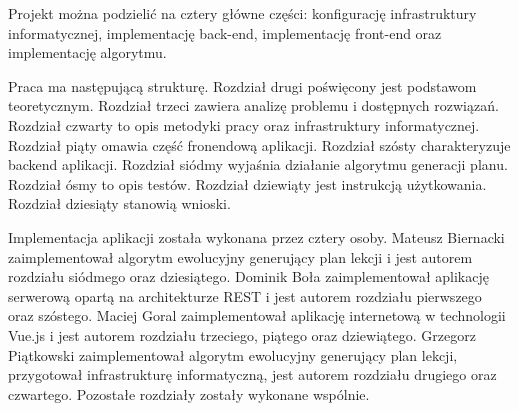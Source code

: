 Projekt można podzielić na cztery główne części: konfigurację infrastruktury informatycznej, implementację back-end, implementację front-end oraz implementację algorytmu.

Praca ma następującą strukturę. Rozdział drugi poświęcony jest podstawom teoretycznym. Rozdział trzeci zawiera analizę problemu i dostępnych rozwiązań. Rozdział czwarty to opis metodyki pracy oraz infrastruktury informatycznej. Rozdział piąty omawia część fronendową aplikacji. Rozdział szósty charakteryzuje backend aplikacji. Rozdział siódmy wyjaśnia działanie algorytmu generacji planu. Rozdział ósmy to opis testów. Rozdział dziewiąty jest instrukcją użytkowania. Rozdział dziesiąty stanowią wnioski. 

Implementacja aplikacji została wykonana przez cztery osoby.
Mateusz Biernacki zaimplementował algorytm ewolucyjny generujący plan lekcji i jest autorem rozdziału siódmego oraz dziesiątego.
Dominik Boła zaimplementował aplikację serwerową opartą na architekturze REST i jest autorem rozdziału pierwszego oraz szóstego.
Maciej Goral zaimplementował aplikację internetową w technologii Vue.js i jest autorem rozdziału trzeciego, piątego oraz dziewiątego.
Grzegorz Piątkowski zaimplementował algorytm ewolucyjny generujący plan lekcji, przygotował infrastrukturę informatyczną, jest autorem rozdziału drugiego oraz czwartego.
Pozostałe rozdziały zostały wykonane wspólnie.

